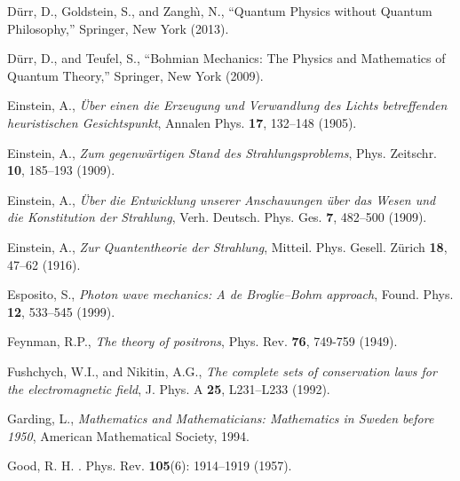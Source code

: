 \documentclass[12pt]{article}
\theoremstyle{definition}
\numberwithin{equation}{section}
\begin{document}
\begin{thebibliography}{[KTZ2020]}
\newblock D\"urr, D., Goldstein, S., and Zangh\`{\i}, N.,
\newblock ``{Quantum Physics without Quantum Philosophy},''
\newblock Springer, New York (2013).\vspace{-4pt}

D\"urr, D.,
and
Teufel, S.,
       ``{Bohmian Mechanics: The Physics and Mathematics of Quantum Theory},''
       Springer, New York (2009).\vspace{-4pt}

  Einstein, A.,
  {\it \"Uber einen die Erzeugung und Verwandlung des Lichts betreffenden heuristischen Gesichtspunkt},
 Annalen Phys. \textbf{17}, 132--148 (1905).\vspace{-4pt}

  Einstein, A.,
 {\it Zum gegenw\"artigen Stand des Strahlungsproblems},
 Phys. Zeitschr. \textbf{10}, 185--193 (1909).\vspace{-4pt}

  Einstein, A.,
  {\it \"Uber die Entwicklung unserer Anschauungen \"uber das Wesen und die Konstitution der Strahlung},
 Verh. Deutsch. Phys. Ges. \textbf{7}, 482--500 (1909).\vspace{-4pt}

  Einstein, A.,
  {\it Zur Quantentheorie der Strahlung},
 Mitteil. Phys. Gesell. Z\"urich \textbf{18}, 47--62 (1916).\vspace{-4pt}

  Esposito, S., 
  \textit{Photon wave mechanics: A de Broglie--Bohm approach}, 
  Found. Phys. \textbf{12}, 533--545 (1999).

        Feynman, R.P.,
               \textit{The theory of positrons},
        Phys. Rev. \textbf{76}, 749-759 (1949).\vspace{-4pt}

  Fushchych, W.I., 
  and
  Nikitin, A.G.,
  \textit{The complete sets of conservation laws for the electromagnetic field},
  J. Phys. A \textbf{25}, L231--L233 (1992).\vspace{-4pt}

Garding, L.,
\textit{Mathematics and Mathematicians: Mathematics in Sweden before 1950},
American Mathematical Society, 1994.

 Good, R. H.
 .
 \newblock Phys. Rev. {\bf 105}(6): 1914--1919 (1957).\vspace{-4pt}


\end{thebibliography}
\end{document}
